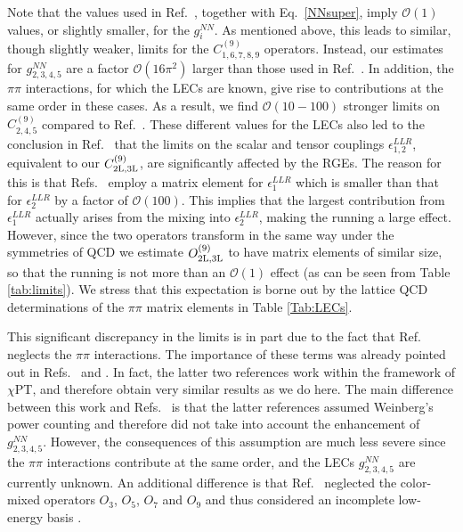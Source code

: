\documentclass[letterpaper,11pt]{article}
\newcommand{\Or}{\mathcal O}
\begin{document}
Note that the values used in Ref.\ \cite{Pas:2000vn}, together with Eq.\ \eqref{NNsuper}, imply $\Or(1)$ values, or slightly smaller, for the $g_{i}^{NN}$. As mentioned above, this leads to similar, though slightly weaker, limits for the $C^{(9)}_{1,6,7,8,9}$ operators. Instead, our estimates for $g_{2,3,4,5}^{NN}$ are a factor $\Or(16\pi^2)$ larger than those used in Ref.\ \cite{Pas:2000vn}. In addition, the $\pi\pi$ interactions, for which the LECs are known, give rise to contributions at the same order in these cases. As a result, we find $\Or(10-100)$ stronger limits on $C^{(9)}_{2,4,5}$ compared to  Ref.\ \cite{Pas:2000vn}.
These different values for the LECs  also led to the conclusion in Ref.\ \cite{Gonzalez:2015ady} that the limits on the scalar and tensor couplings $\epsilon_{1,2}^{LLR}$, equivalent to our $C_{\rm 2L,3L}^{(9)}$, are significantly affected by the RGEs. The reason for this is that Refs.\  \cite{Pas:2000vn,Gonzalez:2015ady} employ a matrix element for $\epsilon_{1}^{LLR}$ which is  smaller than that for $\epsilon_{2}^{LLR}$ by a factor of $\Or(100)$. This implies that the largest contribution from $\epsilon_{1}^{LLR}$ actually arises from the mixing  into $\epsilon_{2}^{LLR}$, making the running a large effect. 
However, since the two operators transform in the same way under the symmetries of QCD we estimate $O_{\rm 2L,3L}^{(9)}$ to have matrix elements of similar size, so that the running is not more than an $\Or(1)$ effect (as can be seen from Table \ref{tab:limits}). We stress that this expectation is borne out by the lattice QCD determinations of the $\pi\pi$ matrix elements in Table \ref{Tab:LECs}.




This significant discrepancy in the limits is in part due to the fact that  Ref.\ \cite{Pas:2000vn} neglects the $\pi\pi$ interactions. The importance of these terms was already pointed out in Refs.\  \cite{Faessler:1996ph} and \cite{Graesser:2016bpz,Prezeau:2003xn}. In fact, the latter two references  work within the framework of $\chi$PT, and therefore obtain very similar results as we do here. The main difference between this work and  Refs.\ \cite{Graesser:2016bpz,Prezeau:2003xn} is that the latter references assumed Weinberg's power counting and therefore did not take into account the enhancement of $g_{2,3,4,5}^{NN}$. However, the consequences of this assumption are much less severe since the $\pi\pi$ interactions contribute at the same order, and the LECs $g_{2,3,4,5}^{NN}$ are currently unknown.
An additional difference  is that  Ref.\ \cite{Prezeau:2003xn} neglected the color-mixed operators $O_3$, $O_5$, $O_7$ and $O_9$ 
and thus considered an incomplete low-energy basis \cite{Graesser:2016bpz}. 
\end{document}

